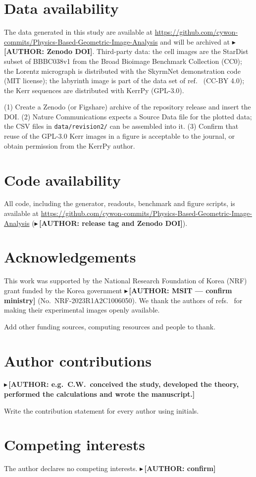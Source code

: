 \documentclass[11pt,a4paper]{article}
\newcommand{\fillin}[1]{\textcolor{todo}{\bfseries $\blacktriangleright$\,[AUTHOR: #1]}}
\begin{document}
\section*{Data availability}
The data generated in this study are available at \url{https://github.com/cywon-commits/Physics-Based-Geometric-Image-Analysis} and will be archived at \fillin{Zenodo DOI}. Third-party data: the cell images are the StarDist subset\cite{Schmidt2018} of BBBC038v1 from the Broad Bioimage Benchmark Collection\cite{Caicedo2019} (CC0); the Lorentz micrograph is distributed with the SkyrmNet demonstration code\cite{McCray2024} (MIT license); the labyrinth image is part of the data set of ref.~ (CC-BY 4.0); the Kerr sequences are distributed with KerrPy\cite{KerrPy} (GPL-3.0).
\begin{authorbox}
(1) Create a Zenodo (or Figshare) archive of the repository release and insert the DOI. (2) Nature Communications expects a Source Data file for the plotted data; the CSV files in \texttt{data/revision2/} can be assembled into it. (3) Confirm that reuse of the GPL-3.0 Kerr images in a figure is acceptable to the journal, or obtain permission from the KerrPy author.
\end{authorbox}

\section*{Code availability}
All code, including the generator, readouts, benchmark and figure scripts, is available at \url{https://github.com/cywon-commits/Physics-Based-Geometric-Image-Analysis} (\fillin{release tag and Zenodo DOI}).




\section*{Acknowledgements}
This work was supported by the National Research Foundation of Korea (NRF) grant funded by the Korea government \fillin{MSIT --- confirm ministry} (No.~NRF-2023R1A2C1006050). We thank the authors of refs.~ for making their experimental images openly available.
\begin{authorbox}
Add other funding sources, computing resources and people to thank.
\end{authorbox}

\section*{Author contributions}
\fillin{e.g.\ C.W.\ conceived the study, developed the theory, performed the calculations and wrote the manuscript.}
\begin{authorbox}
Write the contribution statement for every author using initials.
\end{authorbox}

\section*{Competing interests}
The author declares no competing interests. \fillin{confirm}
\end{document}
